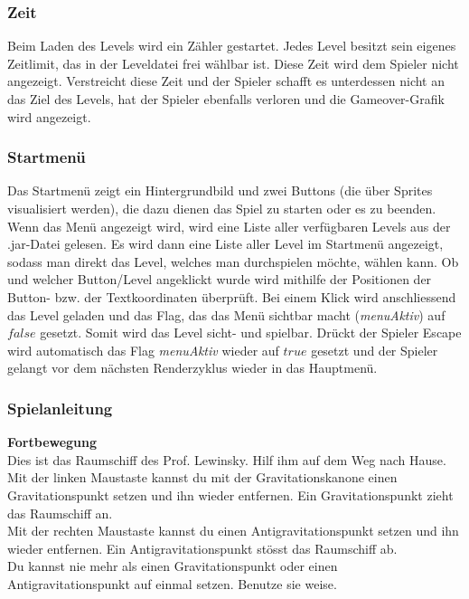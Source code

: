 \documentclass[12pt,a4paper]{scrartcl}
\begin{document}
\subsubsection{Zeit}
Beim Laden des Levels wird ein Zähler gestartet. Jedes Level besitzt sein eigenes Zeitlimit, das in der Leveldatei frei wählbar ist.
Diese Zeit wird dem Spieler nicht angezeigt. Verstreicht diese Zeit und der Spieler schafft es unterdessen nicht an das Ziel des Levels,
hat der Spieler ebenfalls verloren und die Gameover-Grafik wird angezeigt.

\subsubsection{Startmenü}
Das Startmenü zeigt ein Hintergrundbild und zwei Buttons (die über Sprites visualisiert werden), die dazu dienen das Spiel zu starten oder es zu beenden.
Wenn das Menü angezeigt wird, wird eine Liste aller verfügbaren Levels aus der .jar-Datei gelesen. Es wird dann eine
Liste aller Level im Startmenü angezeigt, sodass man direkt das Level, welches man durchspielen möchte, wählen kann.
Ob und welcher Button/Level angeklickt wurde wird mithilfe der Positionen der Button- bzw. der Textkoordinaten überprüft.
Bei einem Klick wird anschliessend das Level geladen und das Flag, das das Menü sichtbar macht (\textit{menuAktiv}) auf $false$
gesetzt. Somit wird das Level sicht- und spielbar. Drückt der Spieler Escape wird automatisch das Flag \textit{menuAktiv} wieder auf $true$
gesetzt und der Spieler gelangt vor dem nächsten Renderzyklus wieder in das Hauptmenü.

\subsubsection{Spielanleitung}
\textbf{Fortbewegung}\\
Dies ist das Raumschiff des Prof. Lewinsky. Hilf ihm auf dem Weg nach Hause.\\
Mit der linken Maustaste kannst du mit der Gravitationskanone einen Gravitationspunkt setzen und ihn wieder entfernen. Ein Gravitationspunkt zieht das Raumschiff an.\\
Mit der rechten Maustaste kannst du einen Antigravitationspunkt setzen und ihn wieder entfernen. Ein Antigravitationspunkt stösst das Raumschiff ab.\\
Du kannst nie mehr als einen Gravitationspunkt oder einen Antigravitationspunkt auf einmal setzen. Benutze sie weise.\\
\end{document}
